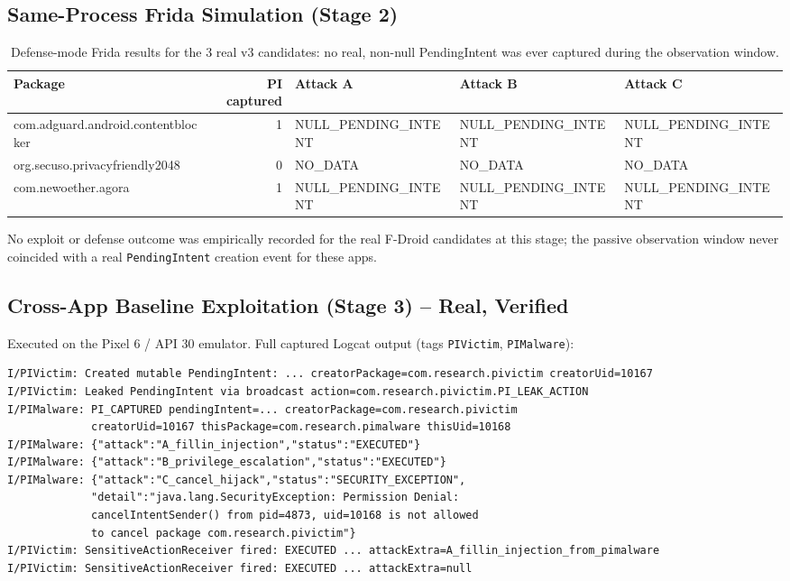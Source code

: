 \documentclass[11pt]{article}
\begin{document}
\subsection{Same-Process Frida Simulation (Stage 2)}

\label{tab:v3-defense}
\begin{table}[h]
\centering
\small
\begin{tabular}{@{}lrlll@{}}
\toprule
\textbf{Package} & \textbf{PI captured} & \textbf{Attack A} & \textbf{Attack B} & \textbf{Attack C} \\
\midrule
com.adguard.android.contentblocker & 1 & NULL\_PENDING\_INTENT & NULL\_PENDING\_INTENT & NULL\_PENDING\_INTENT \\
org.secuso.privacyfriendly2048 & 0 & NO\_DATA & NO\_DATA & NO\_DATA \\
com.newoether.agora & 1 & NULL\_PENDING\_INTENT & NULL\_PENDING\_INTENT & NULL\_PENDING\_INTENT \\
\bottomrule
\end{tabular}
\caption{Defense-mode Frida results for the 3 real v3 candidates: no real,
non-null PendingIntent was ever captured during the observation window.}
\end{table}

No exploit or defense outcome was empirically recorded for the real F-Droid candidates
at this stage; the passive observation window never coincided with a real
\texttt{PendingIntent} creation event for these apps.

\subsection{Cross-App Baseline Exploitation (Stage 3) -- Real, Verified}

Executed on the Pixel 6 / API 30 emulator. Full captured Logcat output (tags
\texttt{PIVictim}, \texttt{PIMalware}):

\begin{lstlisting}
I/PIVictim: Created mutable PendingIntent: ... creatorPackage=com.research.pivictim creatorUid=10167
I/PIVictim: Leaked PendingIntent via broadcast action=com.research.pivictim.PI_LEAK_ACTION
I/PIMalware: PI_CAPTURED pendingIntent=... creatorPackage=com.research.pivictim
             creatorUid=10167 thisPackage=com.research.pimalware thisUid=10168
I/PIMalware: {"attack":"A_fillin_injection","status":"EXECUTED"}
I/PIMalware: {"attack":"B_privilege_escalation","status":"EXECUTED"}
I/PIMalware: {"attack":"C_cancel_hijack","status":"SECURITY_EXCEPTION",
             "detail":"java.lang.SecurityException: Permission Denial:
             cancelIntentSender() from pid=4873, uid=10168 is not allowed
             to cancel package com.research.pivictim"}
I/PIVictim: SensitiveActionReceiver fired: EXECUTED ... attackExtra=A_fillin_injection_from_pimalware
I/PIVictim: SensitiveActionReceiver fired: EXECUTED ... attackExtra=null
\end{lstlisting}
\end{document}

